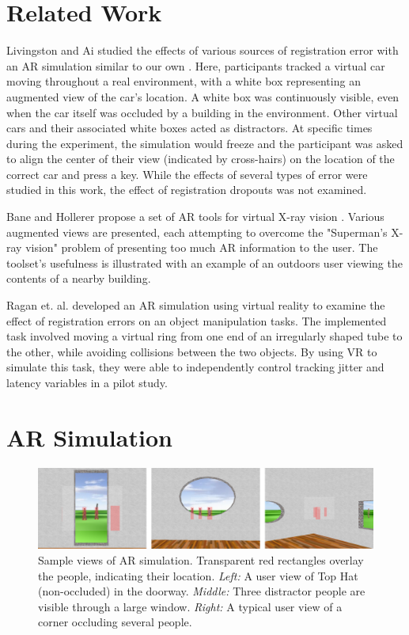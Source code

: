 \documentclass{acmsiggraph}                     %
\begin{document}
\section{Related Work}

Livingston and Ai studied the effects of various sources of registration error with an AR simulation similar to our own \cite{4637329}.  Here, participants tracked a virtual car moving throughout a real environment, with a white box representing an augmented view of the car's location.  A white box was continuously visible, even when the car itself was occluded by a building in the environment.  Other virtual cars and their associated white boxes acted as distractors.  At specific times during the experiment, the simulation would freeze and the participant was asked to align the center of their view (indicated by cross-hairs) on the location of the correct car and press a key.  While the effects of several types of error were studied in this work, the effect of registration dropouts was not examined.

Bane and Hollerer propose a set of AR tools for virtual X-ray vision \cite{1383060}.  Various augmented views are presented, each attempting to overcome the "Superman's X-ray vision" problem of presenting too much AR information to the user.  The toolset's usefulness is illustrated with an example of an outdoors user viewing the contents of a nearby building.

Ragan et. al. \cite{4811058} developed an AR simulation using virtual reality to examine the effect of registration errors on an object manipulation tasks.  The implemented task involved moving a virtual ring from one end of an irregularly shaped tube to the other, while avoiding collisions between the two objects.  By using VR to simulate this task, they were able to independently control tracking jitter and latency variables in a pilot study.



\section{AR Simulation}

\begin{figure}[ht!]
	\centering
	\includegraphics[width=7in]{figures/triple_view.png}
	\caption{Sample views of AR simulation.  Transparent red rectangles overlay the people, indicating their location.  \emph{Left:} A user view of Top Hat (non-occluded) in the doorway.   \emph{Middle:} Three distractor people are visible through a large window.  \emph{Right:} A typical user view of a corner occluding several people.}
\end{figure}
\end{document}
